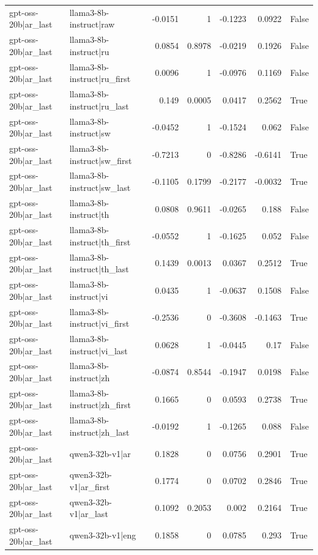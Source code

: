 \begin{table}
\begin{tabular}{l l r r r r l}
gpt-oss-20b|ar_last & llama3-8b-instruct|raw & -0.0151 & 1 & -0.1223 & 0.0922 & False \\
gpt-oss-20b|ar_last & llama3-8b-instruct|ru & 0.0854 & 0.8978 & -0.0219 & 0.1926 & False \\
gpt-oss-20b|ar_last & llama3-8b-instruct|ru_first & 0.0096 & 1 & -0.0976 & 0.1169 & False \\
gpt-oss-20b|ar_last & llama3-8b-instruct|ru_last & 0.149 & 0.0005 & 0.0417 & 0.2562 & True \\
gpt-oss-20b|ar_last & llama3-8b-instruct|sw & -0.0452 & 1 & -0.1524 & 0.062 & False \\
gpt-oss-20b|ar_last & llama3-8b-instruct|sw_first & -0.7213 & 0 & -0.8286 & -0.6141 & True \\
gpt-oss-20b|ar_last & llama3-8b-instruct|sw_last & -0.1105 & 0.1799 & -0.2177 & -0.0032 & True \\
gpt-oss-20b|ar_last & llama3-8b-instruct|th & 0.0808 & 0.9611 & -0.0265 & 0.188 & False \\
gpt-oss-20b|ar_last & llama3-8b-instruct|th_first & -0.0552 & 1 & -0.1625 & 0.052 & False \\
gpt-oss-20b|ar_last & llama3-8b-instruct|th_last & 0.1439 & 0.0013 & 0.0367 & 0.2512 & True \\
gpt-oss-20b|ar_last & llama3-8b-instruct|vi & 0.0435 & 1 & -0.0637 & 0.1508 & False \\
gpt-oss-20b|ar_last & llama3-8b-instruct|vi_first & -0.2536 & 0 & -0.3608 & -0.1463 & True \\
gpt-oss-20b|ar_last & llama3-8b-instruct|vi_last & 0.0628 & 1 & -0.0445 & 0.17 & False \\
gpt-oss-20b|ar_last & llama3-8b-instruct|zh & -0.0874 & 0.8544 & -0.1947 & 0.0198 & False \\
gpt-oss-20b|ar_last & llama3-8b-instruct|zh_first & 0.1665 & 0 & 0.0593 & 0.2738 & True \\
gpt-oss-20b|ar_last & llama3-8b-instruct|zh_last & -0.0192 & 1 & -0.1265 & 0.088 & False \\
gpt-oss-20b|ar_last & qwen3-32b-v1|ar & 0.1828 & 0 & 0.0756 & 0.2901 & True \\
gpt-oss-20b|ar_last & qwen3-32b-v1|ar_first & 0.1774 & 0 & 0.0702 & 0.2846 & True \\
gpt-oss-20b|ar_last & qwen3-32b-v1|ar_last & 0.1092 & 0.2053 & 0.002 & 0.2164 & True \\
gpt-oss-20b|ar_last & qwen3-32b-v1|eng & 0.1858 & 0 & 0.0785 & 0.293 & True \\

\end{tabular}
\end{table}
